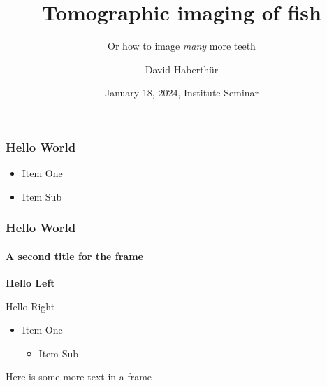 \documentclass[aspectratio=169,10pt]{beamer}
\title{Tomographic imaging of fish}
\subtitle{Or how to image \emph{many} more teeth}
\author{David Haberthür}
\institute{Institute of Anatomy\\Universität Bern}
\date{January 18, 2024, Institute Seminar}
\begin{document}
\begin{frame}
\maketitle
\end{frame}

\begin{frame}
	\frametitle{Hello World}
	\begin{itemize}
	\item Item One
	\item Item Sub
	\end{itemize}
\end{frame}

\begin{frame}
	\frametitle{Hello World}
\framesubtitle{A second title for the frame}
\begin{flushleft}
\textbf{Hello Left}
\end{flushleft}
\begin{flushright}
Hello Right
\end{flushright}

\begin{itemize}
\item Item One
\begin{itemize}
\item Item Sub
\end{itemize}
\end{itemize}
\end{frame}

\begin{frame}
Here is some more text in a frame
\end{frame}
\end{document}
